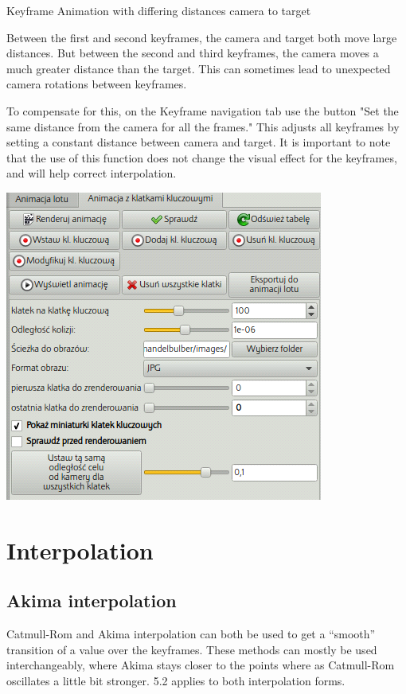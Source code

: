 Keyframe Animation with differing distances camera to target

Between the first and second keyframes, the camera and target both move
large distances. But between the second and third keyframes, the camera
moves a much greater distance than the target. This can sometimes lead
to unexpected camera rotations between keyframes.

To compensate for this, on the Keyframe navigation tab use the button
"Set the same distance from the camera for all the frames." This adjusts
all keyframes by setting a constant distance between camera and target.
It is important to note that the use of this function does not change
the visual effect for the keyframes, and will help correct
interpolation.

\includegraphics[width=4.11597in,height=4.02292in]{img/manual/media/image19.png}

\section{Interpolation}\label{interpolation}

\subsection{Akima interpolation}\label{akima-interpolation}

Catmull-Rom and Akima interpolation can both be used to get a ``smooth''
transition of a value over the keyframes. These methods can mostly be
used interchangeably, where Akima stays closer to the points where as
Catmull-Rom oscillates a little bit stronger. 5.2 applies to both
interpolation forms.

